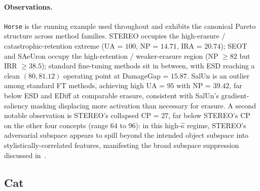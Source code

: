 \paragraph{Observations.}
\texttt{Horse} is the running example used throughout  and exhibits the canonical Pareto structure across method families. STEREO occupies the high-erasure / catastrophic-retention extreme (UA = $100$, NP = $14.71$, IRA = $20.74$); SEOT and SAeUron occupy the high-retention / weaker-erasure region (NP $\geq 82$ but IRR $\geq 38.5$); standard fine-tuning methods sit in between, with ESD reaching a clean $(80, 81.12)$ operating point at DamageGap = $15.87$. SalUn is an outlier among standard FT methods, achieving high UA = $95$ with NP = $39.42$, far below ESD and EDiff at comparable erasure, consistent with SalUn's gradient-saliency masking displacing more activation than necessary for erasure. A second notable observation is STEREO's collapsed CP = $27$, far below STEREO's CP on the other four concepts (range $64$ to $96$): in this high-$\hat\kappa$ regime, STEREO's adversarial subspace appears to spill beyond the intended object subspace into stylistically-correlated features, manifesting the broad subspace suppression discussed in~.
\subsection{Cat}
\label{app:per_concept_cat}

